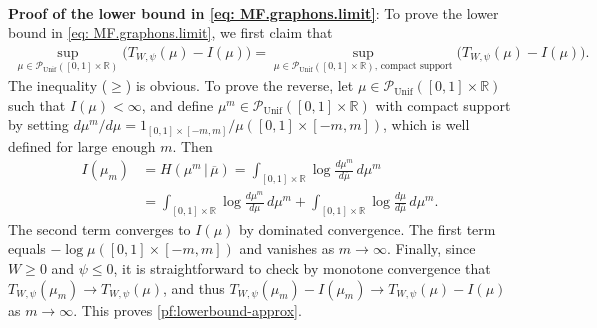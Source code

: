 \documentclass[11pt,reqno]{amsart}
\numberwithin{equation}{section}
\theoremstyle{definition}
\def\R{{\mathbb R}}
\def\P{{\mathcal P}}
\def\Punif{\P_{\mathrm{Unif}}([0,1] \times \R)}
\begin{document}
{\ }


\noindent\textbf{Proof of the lower bound in \eqref{eq: MF.graphons.limit}}: 
To prove the lower bound in \eqref{eq: MF.graphons.limit}, we first claim that
\begin{align}
	\sup_{\mu\in \Punif} \big( T_{W,\psi}(\mu)-I(\mu)\big) = \sup_{\mu\in \Punif, \, \text{compact support}} \big( T_{W,\psi}(\mu)-I(\mu)\big). \label{pf:lowerbound-approx}
\end{align}
The inequality ($\ge$) is obvious.
To prove the reverse, let $\mu \in \Punif$ such that $I(\mu) < \infty$, and define $\mu^m \in \Punif$ with compact support by setting $d\mu^m/d\mu=1_{[0,1] \times [-m,m]}/\mu([0,1] \times [-m,m])$, which is well defined for large enough $m$. Then
\begin{align*}
	I(\mu_m) &= H(\mu^m\,|\,\overline{\mu}) = \int_{[0,1] \times \R} \log \frac{d\mu^m}{d\overline{\mu}} \,d\mu^m \\
	&=  \int_{[0,1] \times \R} \log \frac{d\mu^m}{d\mu} \,d\mu^m + \int_{[0,1] \times \R} \log \frac{d\mu}{d\overline{\mu}} \,d\mu^m.
\end{align*}
The second term converges to $I(\mu)$ by dominated convergence. The first term equals $-\log \mu([0,1] \times [-m,m])$ and vanishes as $m\to\infty$. Finally, since $W \ge 0$ and $\psi \le 0$, it is straightforward to check by monotone convergence that $T_{W,\psi}(\mu_m) \to T_{W,\psi}(\mu)$, and thus $T_{W,\psi}(\mu_m)-I(\mu_m) \to T_{W,\psi}(\mu)-I(\mu)$ as $m\to\infty$. This proves \eqref{pf:lowerbound-approx}.
\end{document}
